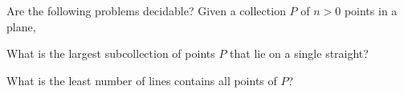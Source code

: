   Are the following problems decidable?
  Given a collection $P$ of $n > 0$ points in a plane,
  \begin{tightlist}
    \item What is the largest subcollection of points $P$ that lie
    on a single straight?
    \item What is the least number of lines contains all points of $P$?
  \end{tightlist}
